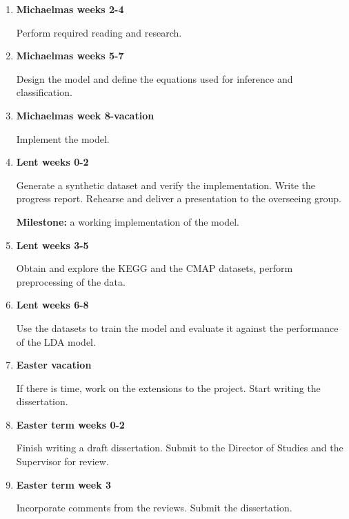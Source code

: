 \documentclass[12pt,a4]{article}
\begin{document}
\begin{enumerate}

\item {\bf Michaelmas weeks 2-4} 

Perform required reading and research.

\item {\bf Michaelmas weeks 5-7} 

Design the model and define the equations used for inference and classification.

\item {\bf Michaelmas week 8-vacation} 

Implement the model.

\item {\bf Lent weeks 0-2} 

Generate a synthetic dataset and verify the implementation. Write the progress report. Rehearse and deliver a presentation to the overseeing group.

\textbf{Milestone:} a working implementation of the model.

\item {\bf Lent weeks 3-5} 

Obtain and explore the KEGG and the CMAP datasets, perform preprocessing of the data.

\item {\bf Lent weeks 6-8}

Use the datasets to train the model and evaluate it against the performance of the LDA model.

\item {\bf Easter vacation} 

If there is time, work on the extensions to the project. Start writing the dissertation.

\item {\bf Easter term weeks 0-2}

Finish writing a draft dissertation. Submit to the Director of Studies and the Supervisor for review.

\item {\bf Easter term week 3}

Incorporate comments from the reviews. Submit the dissertation.

\end{enumerate}



\end{document}
